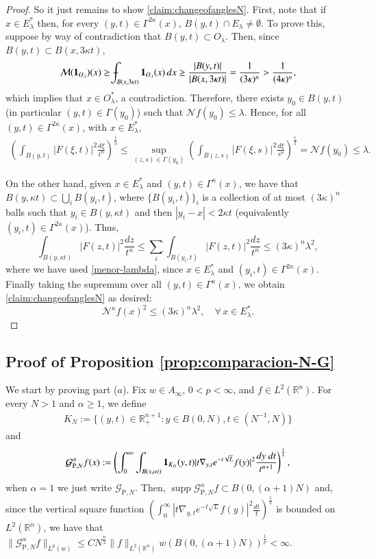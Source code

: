 \documentclass[11pt, a4paper,leqno]{amsart}
\def\Xint#1{\mathchoice
    {\XXint\displaystyle\textstyle{#1}}%
    {\XXint\textstyle\scriptstyle{#1}}%
    {\XXint\scriptstyle\scriptscriptstyle{#1}}%
    {\XXint\scriptscriptstyle\scriptscriptstyle{#1}}%
    \!\int}
\def\XXint#1#2#3{{\setbox0=\hbox{$#1{#2#3}{\int}$}
    \vcenter{\hbox{$#2#3$}}\kern-.5\wd0}}
\def\dashint{\Xint-}
\def\Xint#1{\mathchoice
    {\XXint\displaystyle\textstyle{#1}}%
    {\XXint\textstyle\scriptstyle{#1}}%
    {\XXint\scriptstyle\scriptscriptstyle{#1}}%
    {\XXint\scriptscriptstyle\scriptscriptstyle{#1}}%
    \!\int}
\def\XXint#1#2#3{{\setbox0=\hbox{$#1{#2#3}{\int}$}
    \vcenter{\hbox{$#2#3$}}\kern-.5\wd0}}
\renewcommand{\chi}{{\bf 1}}
\theoremstyle{plain}
\theoremstyle{definition}
\theoremstyle{remark}
\numberwithin{equation}{section}
\def \R{ \mathbb{R} }
\def \pp{ \mathrm{P} }
\def \Gcal { \mathcal{G} }
\def \Ncal { \mathcal{N} }
\DeclareMathOperator{\supp}{supp}
\begin{document}
\begin{proof}
So it just remains to show \eqref{claim:changeofanglesN}. First, note that if  $x\in E_{\lambda}^*$ then, for every $(y,t)\in \Gamma^{2\kappa}(x)$, $B(y,t)\cap E_{\lambda}\neq \emptyset$. To prove this, suppose by way of contradiction that $B(y,t)\subset O_{\lambda}$. Then, since $B(y,t)\subset B(x,3\kappa t)$,
$$
\mathcal{M}(\chi_{O_{\lambda}})(x)\geq \dashint_{B(x,3\kappa t)}\chi_{{O}_{\lambda}}(x)\,dx\geq\frac{|B(y,t)|}{|B(x,3\kappa t)|}=\frac{1}{(3\kappa)^n}>\frac{1}{(4\kappa)^n},
$$ 
which implies that $x\in O_{\lambda}^*$, a contradiction. Therefore, there exists $y_0\in B(y,t)$ (in particular $(y,t)\in \Gamma(y_0)$) such that $\mathcal{N}f(y_0)\leq \lambda$. Hence, for all  $(y,t)\in \Gamma^{2\kappa}(x)$, with $x\in E_{\lambda}^*$,
\begin{align}\label{menor-lambda}
\left(\int_{B(y,t)}|F(\xi,t)|^2\frac{d\xi}{t^n}\right)^{\frac{1}{2}}
\leq \sup_{(z,s)\in \Gamma(y_0)}
\left(\int_{B(z,s)}|F(\xi,s)|^2\frac{d\xi}{s^n}\right)^{\frac{1}{2}}=\Ncal f(y_0)\leq \lambda.
\end{align}

On the other hand, given $x\in E^*_{\lambda}$ and $(y,t)\in \Gamma^{\kappa}(x)$, we have that 
$B(y,\kappa t)\subset\bigcup_iB(y_i,t)$, where $\{B(y_i,t)\}_i$ is a collection of at most $(3\kappa)^n$ balls such that $y_i\in B(y,\kappa t)$ and then $|y_i-x|<2\kappa t$ (equivalently $(y_i,t)\in \Gamma^{2\kappa}(x)$). Thus,
$$
\int_{B(y,\kappa t)}|F(z,t)|^2\frac{dz}{t^n}\leq \sum_i
\int_{B(y_i,t)}|F(z,t)|^2\frac{dz}{t^n}
\leq (3\kappa)^n \lambda^2,
$$
where we have used \eqref{menor-lambda}, since $x\in E_{\lambda}^*$ and $(y_i,t)\in \Gamma^{2\kappa}(x)$.
Finally taking the supremum over all $(y,t)\in \Gamma^{\kappa}(x)$, we obtain \eqref{claim:changeofanglesN} as desired:
$$
\mathcal{N}^{\kappa}f(x)^2\leq (3\kappa)^n \lambda^2,\quad \forall\,x\in E_{\lambda}^*.
$$
\end{proof}

\subsection{Proof of Proposition \ref{prop:comparacion-N-G}}

We start by proving part ($a$).
Fix $w\in A_{\infty}$, $0<p<\infty$, and $f\in L^2(\mathbb{R}^n)$. For every $N>1$ and $\alpha\geq 1$, we define
\begin{align}\label{N-KN}
K_N:=\{(y,t)\in \R^{n+1}_+: y\in B(0,N), t\in (N^{-1},N)\}
\end{align}
and 
\begin{align*}
\Gcal_{\pp,N}^{\alpha}f(x):=\left(\int_{0}^{\infty}\int_{B(x,\alpha t)}\chi_{K_N}(y,t)|t\nabla_{y,t}e^{-t\sqrt{L}}f(y)|^2\frac{dy \ dt}{t^{n+1}}\right)^{\frac{1}{2}},
\end{align*}
when $\alpha=1$ we just write $\Gcal_{\pp,N}$.
Then,
$
\supp \Gcal_{\pp,N}^{\alpha}f\subset B(0,(\alpha+1)N)$ and, since the vertical square function $\left(\int_0^{\infty}|t\nabla_{y,t}e^{-t\sqrt{L}}f(y)|^2\frac{dt}{t}\right)^{\frac{1}{2}}$ is bounded on $L^2(\R^n)$, we have that $\|\Gcal_{\pp,N}^{\alpha}f\|_{L^p(w)}\leq C N^{\frac{n}{2}}\|f\|_{L^2(\mathbb{R}^n)} w(B(0,(\alpha+1)N))^{\frac{1}{p}}<\infty.
$
\end{document}
